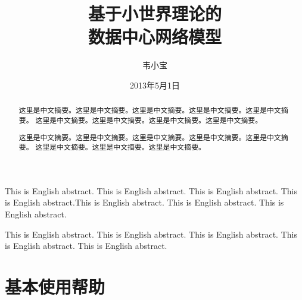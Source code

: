 \documentclass[oneside, phd]{njuthesis}
\title{基于小世界理论的\\ 数据中心网络模型}
\author{韦小宝}
\institute{南京大学}
\date{2013年5月1日}
\begin{document}
\maketitle
\makeenglishtitle

\frontmatter

\begin{abstract}
这里是中文摘要。这里是中文摘要。这里是中文摘要。这里是中文摘要。这里是中文摘要。
这里是中文摘要。这里是中文摘要。这里是中文摘要。这里是中文摘要。

这里是中文摘要。这里是中文摘要。这里是中文摘要。这里是中文摘要。这里是中文摘要。
这里是中文摘要。这里是中文摘要。这里是中文摘要。

\end{abstract}

\begin{englishabstract}

This is English abstract. This is English abstract. This is English
abstract. This is English abstract.This is English abstract. This is English
abstract. This is English abstract.

This is English abstract. This is English abstract. This is English
abstract. This is English abstract. This is English abstract.

\end{englishabstract}

\tableofcontents

\listoftables
\listoffigures

\mainmatter

\chapter{基本使用帮助}\label{C:intro}
\end{document}
